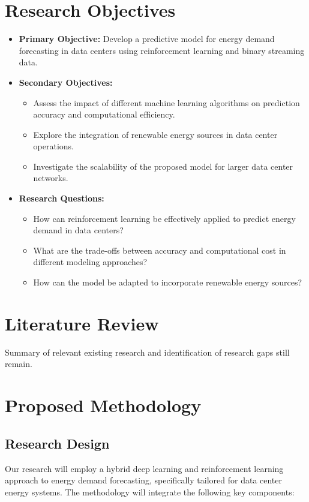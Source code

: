 \documentclass[12pt]{article}
\begin{document}
\section{Research Objectives}
\begin{itemize}
    \item \textbf{Primary Objective:} Develop a predictive model for energy demand forecasting in data centers using reinforcement learning and binary streaming data.
    \item \textbf{Secondary Objectives:}
    \begin{itemize}
        \item Assess the impact of different machine learning algorithms on prediction accuracy and computational efficiency.
        \item Explore the integration of renewable energy sources in data center operations.
        \item Investigate the scalability of the proposed model for larger data center networks.
    \end{itemize}
    \item \textbf{Research Questions:}
    \begin{itemize}
        \item How can reinforcement learning be effectively applied to predict energy demand in data centers?
        \item What are the trade-offs between accuracy and computational cost in different modeling approaches?
        \item How can the model be adapted to incorporate renewable energy sources?
    \end{itemize}
\end{itemize}

\section{Literature Review}
Summary of relevant existing research and identification of research gaps still remain.

\section{Proposed Methodology}
\subsection{Research Design}
Our research will employ a hybrid deep learning and reinforcement learning approach to energy demand forecasting, specifically tailored for data center energy systems. The methodology will integrate the following key components:
\end{document}
